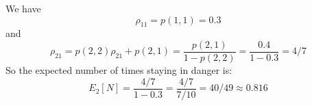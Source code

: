 \documentclass{homework}
\begin{document}
\begin{letterenum}
We have
\begin{equation*}
    \rho_{11} = p(1, 1) = 0.3
\end{equation*}
and
\begin{equation*}
    \rho_{21} = p(2, 2) \rho_{21} + p(2, 1) = \frac{p(2, 1)}{1 - p(2, 2)}
        = \frac{0.4}{1 - 0.3} = 4/7
\end{equation*}
So the expected number of times staying in danger is:
\begin{equation*}
    E_2[N] = \frac{4/7}{1 - 0.3} = \frac{4/7}{7/10} = \boxed{40/49 \approx 0.816}
\end{equation*}

    
\end{letterenum}
\end{document}
